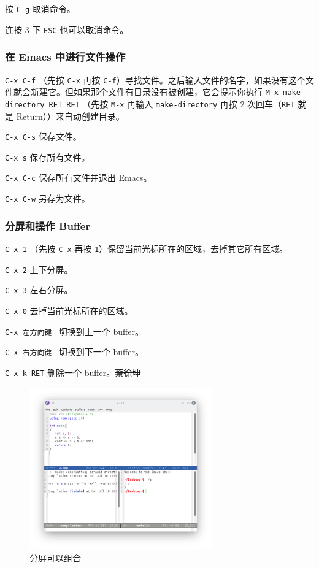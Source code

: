 \documentclass[UTF-8]{ctexart}
\begin{document}
				按 \texttt{C-g} 取消命令。
				
				连按 3 下 \texttt{ESC} 也可以取消命令。
				
			\subsubsection{在 Emacs 中进行文件操作}
			
				\texttt{C-x C-f} （先按 \texttt{C-x} 再按 \texttt{C-f}）寻找文件。之后输入文件的名字，如果没有这个文件就会新建它。但如果那个文件有目录没有被创建，它会提示你执行 \texttt{M-x make-directory RET RET} （先按 \texttt{M-x} 再输入 \texttt{make-directory} 再按 2 次回车（\texttt{RET} 就是 Return））来自动创建目录。
				
				\texttt{C-x C-s} 保存文件。
				
				\texttt{C-x s} 保存所有文件。
				
				\texttt{C-x C-c} 保存所有文件并退出 Emacs。
				
				\texttt{C-x C-w} 另存为文件。
			
			\subsubsection{分屏和操作 Buffer}
				
				\texttt{C-x 1} （先按 \texttt{C-x} 再按 \texttt{1}）保留当前光标所在的区域，去掉其它所有区域。
				
				\texttt{C-x 2} 上下分屏。
				
				\texttt{C-x 3} 左右分屏。
				
				\texttt{C-x 0} 去掉当前光标所在的区域。
				
				\texttt{C-x 左方向键} ~切换到上一个 buffer。
				
				\texttt{C-x 右方向键} ~切换到下一个 buffer。
				
				\texttt{C-x k RET} 删除一个 buffer。\sout{蔡徐坤}
				
				\begin{figure}[H]
					\centering
					\includegraphics[width=0.7\textwidth]{fig/emacs_teach_split.png}
					\caption*{分屏可以组合}
				\end{figure}
			
\end{document}
